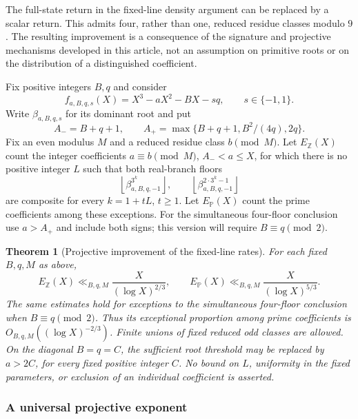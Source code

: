 \documentclass[11pt,a4paper]{article}
\newtheorem{theorem}{Theorem}[section]
\theoremstyle{definition}\newtheorem{definition}[theorem]{Definition}
\theoremstyle{remark}\newtheorem{remark}[theorem]{Remark}
\begin{document}
The full-state return in the fixed-line density argument can be replaced
by a scalar return. This admits four, rather than one, reduced residue
classes modulo $9$. The resulting improvement is a consequence of the
signature and projective mechanisms developed in this article, not an assumption on
primitive roots or on the distribution of a distinguished coefficient.

Fix positive integers $B,q$ and consider
\[
 f_{a,B,q,s}(X)=X^3-aX^2-BX-sq,\qquad s\in\{-1,1\}.
\]
Write $\beta_{a,B,q,s}$ for its dominant root and put
\[
 A_-=B+q+1,\qquad
 A_+=\max\{B+q+1,B^2/(4q),2q\}.
\]
Fix an even modulus $M$ and a reduced residue class $b\pmod M$.
Let $E_{\mathbb Z}(X)$ count the integer coefficients
$a\equiv b\pmod M$, $A_-<a\le X$, for which there is no positive
integer $L$ such that both real-branch floors
\[
 \left\lfloor\beta_{a,B,q,-1}^{3^k}\right\rfloor,
 \qquad
 \left\lfloor\beta_{a,B,q,-1}^{2\cdot3^k-1}\right\rfloor
\]
are composite for every $k=1+tL$, $t\ge1$.
Let $E_{\mathbb P}(X)$ count the prime coefficients among these exceptions.
For the simultaneous four-floor conclusion use $a>A_+$ and include
both signs; this version will require $B\equiv q\pmod2$.

\begin{theorem}[Projective improvement of the fixed-line rates]
\label{R11:syn:projective-density-rate}
For each fixed $B,q,M$ as above,
\[
 E_{\mathbb Z}(X)\ll_{B,q,M}\frac{X}{(\log X)^{2/3}},
 \qquad
 E_{\mathbb P}(X)\ll_{B,q,M}\frac{X}{(\log X)^{5/3}}.
\]
The same estimates hold for exceptions to the simultaneous four-floor
conclusion when $B\equiv q\pmod2$.
Thus its exceptional proportion among prime coefficients is
$O_{B,q,M}((\log X)^{-2/3})$.
Finite unions of fixed reduced odd classes are allowed.
On the diagonal $B=q=C$, the sufficient root threshold may be replaced
by $a>2C$, for every fixed positive integer $C$.
No bound on $L$, uniformity in the fixed parameters, or exclusion of
an individual coefficient is asserted.
\end{theorem}

\subsubsection{A universal projective exponent}
\end{document}
